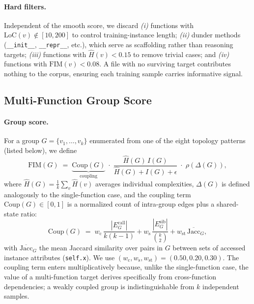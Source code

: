 \paragraph{Hard filters.}
Independent of the smooth score, we discard \textit{(i)} functions with
$\mathrm{LoC}(v) \notin [10, 200]$ to control training-instance length;
\textit{(ii)} dunder methods (\texttt{\_\_init\_\_}, \texttt{\_\_repr\_\_},
etc.), which serve as scaffolding rather than reasoning targets;
\textit{(iii)} functions with $\hat{H}(v) < 0.15$ to remove trivial
cases; and \textit{(iv)} functions with $\mathrm{FIM}(v) < 0.08$. A file
with no surviving target contributes nothing to the corpus, ensuring each
training sample carries informative signal.

\subsection{Multi-Function Group Score}
\label{app:algo:groups}

\paragraph{Group score.}
For a group $G = \{v_1, \dots, v_k\}$ enumerated from one of the eight
topology patterns (listed below), we define
%
\begin{equation}
  \mathrm{FIM}(G) \;=\;
  \underbrace{\mathrm{Coup}(G)}_{\text{coupling}}
  \;\cdot\;
  \frac{\hat{H}(G)\,\hat{I}(G)}{\hat{H}(G) + \hat{I}(G) + \epsilon}
  \;\cdot\;
  \rho\!\left(\Delta(G)\right),
  \label{eq:fim_group}
\end{equation}
%
where $\hat{H}(G) = \tfrac{1}{k}\sum_v \hat{H}(v)$ averages individual
complexities, $\Delta(G)$ is defined analogously to the single-function
case, and the coupling term $\mathrm{Coup}(G) \in [0, 1]$ is a normalized
count of intra-group edges plus a shared-state ratio:
%
\begin{equation}
  \mathrm{Coup}(G)
  \;=\; w_{\mathrm{c}}\,\frac{|E^{\text{call}}_G|}{k(k\!-\!1)}
   + w_{\mathrm{s}}\,\frac{|E^{\text{sib}}_G|}{\binom{k}{2}}
   + w_{\mathrm{st}}\,\overline{\mathrm{Jacc}}_G,
  \label{eq:coupling}
\end{equation}
%
with $\overline{\mathrm{Jacc}}_G$ the mean Jaccard similarity over pairs in
$G$ between sets of accessed instance attributes (\texttt{self.x}). We use
$(w_{\mathrm{c}}, w_{\mathrm{s}}, w_{\mathrm{st}}) = (0.50, 0.20, 0.30)$.
The coupling term enters multiplicatively because, unlike the
single-function case, the value of a multi-function target derives
specifically from cross-function dependencies; a weakly coupled group is
indistinguishable from $k$ independent samples.

